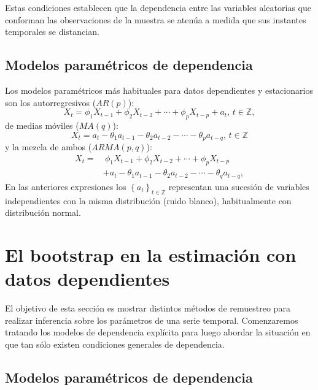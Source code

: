\documentclass[
]{book}
\theoremstyle{definition}
\theoremstyle{definition}
\theoremstyle{definition}
\theoremstyle{remark}
\begin{document}
Estas condiciones establecen que la dependencia entre las variables
aleatorias que conforman las observaciones de la muestra se atenúa a
medida que sus instantes temporales se distancian.

\hypertarget{modelos-paramuxe9tricos-de-dependencia}{%
\subsection{Modelos paramétricos de dependencia}\label{modelos-paramuxe9tricos-de-dependencia}}

Los modelos paramétricos más habituales para datos dependientes y
estacionarios son los autorregresivos (\(AR\left( p \right)\)):
\[X_{t}=\phi _1X_{t-1}+\phi _2X_{t-2}+\cdots +\phi _{p}X_{t-p}+a_{t}
\text{, }t\in \mathbb{Z},\]
de medias móviles (\(MA\left( q \right)\)):
\[X_{t}=a_{t}-\theta _1a_{t-1}-\theta _2a_{t-2}-\cdots -\theta _{p}a_{t-q}
\text{, }t\in \mathbb{Z}\]
y la mezcla de ambos (\(ARMA\left( p,q \right)\)):
\[\begin{aligned}
X_{t} =&\ \phi _1X_{t-1}+\phi _2X_{t-2}+\cdots +\phi _{p}X_{t-p} \\
&+a_{t}-\theta _1a_{t-1}-\theta _2a_{t-2}-\cdots -\theta _{q}a_{t-q},\end{aligned}\]
En las anteriores expresiones los
\(\left\{ a_{t}\right\} _{t\in \mathbb{Z}}\) representan una sucesión de
variables independientes con la misma distribución (ruido blanco),
habitualmente con distribución normal.

\hypertarget{el-bootstrap-en-la-estimaciuxf3n-con-datos-dependientes}{%
\section{El bootstrap en la estimación con datos dependientes}\label{el-bootstrap-en-la-estimaciuxf3n-con-datos-dependientes}}

El objetivo de esta sección es mostrar distintos métodos de remuestreo
para realizar inferencia sobre los parámetros de una serie temporal.
Comenzaremos tratando los modelos de dependencia explícita para luego
abordar la situación en que tan sólo existen condiciones generales de
dependencia.

\hypertarget{modelos-paramuxe9tricos-de-dependencia-1}{%
\subsection{Modelos paramétricos de dependencia}\label{modelos-paramuxe9tricos-de-dependencia-1}}
\end{document}
